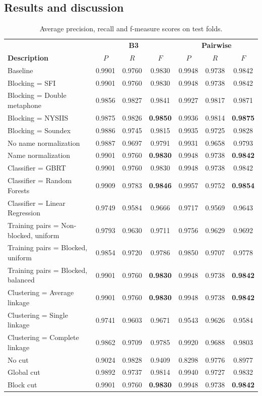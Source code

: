 \documentclass{article}
\begin{document}
\subsection{Results and discussion}

\begin{table}
\caption{Average precision, recall and f-measure scores on test folds.}
\label{table:results}
\centering
\begin{tabular}{|l|c c c|c c c|}
  \hline
                       & \multicolumn{3}{|c|}{\textbf{B3}} & \multicolumn{3}{|c|}{\textbf{Pairwise}} \\
  \textbf{Description} & $P$ & $R$ & $F$ & $P$ & $R$ & $F$\\
  \hline
  \hline
Baseline & 0.9901 & 0.9760 & 0.9830 & 0.9948 & 0.9738 & 0.9842 \\
\hline
\hline
Blocking = SFI & 0.9901 & 0.9760 & 0.9830 & 0.9948 & 0.9738 & 0.9842 \\
Blocking = Double metaphone & 0.9856 & 0.9827 & 0.9841 & 0.9927 & 0.9817 & 0.9871 \\
Blocking = NYSIIS & 0.9875 & 0.9826 & \textbf{0.9850} & 0.9936 & 0.9814 & \textbf{0.9875} \\
Blocking = Soundex & 0.9886 & 0.9745 & 0.9815 & 0.9935 & 0.9725 & 0.9828 \\
\hline
No name normalization & 0.9887 & 0.9697 & 0.9791 & 0.9931 & 0.9658 & 0.9793 \\
Name normalization & 0.9901 & 0.9760 & \textbf{0.9830} & 0.9948 & 0.9738 & \textbf{0.9842} \\
\hline
Classifier = GBRT & 0.9901 & 0.9760 & 0.9830 & 0.9948 & 0.9738 & 0.9842 \\
Classifier = Random Forests & 0.9909 & 0.9783 & \textbf{0.9846} & 0.9957 & 0.9752 & \textbf{0.9854} \\
Classifier = Linear Regression & 0.9749 & 0.9584 & 0.9666 & 0.9717 & 0.9569 & 0.9643 \\
\hline
Training pairs = Non-blocked, uniform & 0.9793 & 0.9630 & 0.9711 & 0.9756 & 0.9629 & 0.9692 \\
Training pairs = Blocked, uniform & 0.9854 & 0.9720 & 0.9786 & 0.9850 & 0.9707 & 0.9778 \\
Training pairs = Blocked, balanced & 0.9901 & 0.9760 & \textbf{0.9830} & 0.9948 & 0.9738 & \textbf{0.9842} \\
\hline
Clustering = Average linkage & 0.9901 & 0.9760 & \textbf{0.9830} & 0.9948 & 0.9738 & \textbf{0.9842} \\
Clustering = Single linkage & 0.9741 & 0.9603 & 0.9671 & 0.9543 & 0.9626 & 0.9584 \\
Clustering = Complete linkage & 0.9862 & 0.9709 & 0.9785 & 0.9920 & 0.9688 & 0.9803 \\
\hline
No cut & 0.9024 & 0.9828 & 0.9409 & 0.8298 & 0.9776 & 0.8977 \\
Global cut & 0.9892 & 0.9737 & 0.9814 & 0.9940 & 0.9727 & 0.9832 \\
Block cut & 0.9901 & 0.9760 & \textbf{0.9830} & 0.9948 & 0.9738 & \textbf{0.9842} \\
  \hline
\end{tabular}
\end{table}
\end{document}
